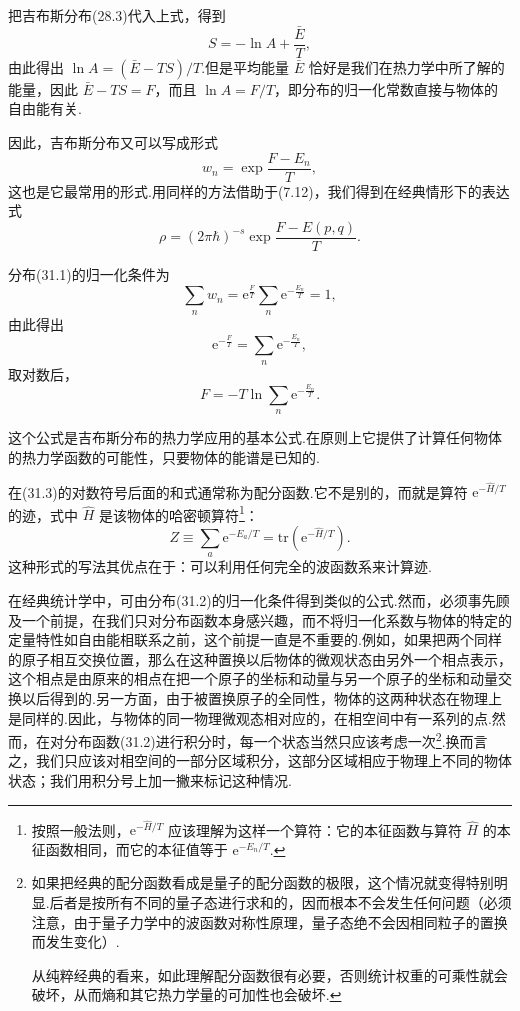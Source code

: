 把吉布斯分布(28.3)代入上式，得到
\begin{equation*}
  S=-\ln A+\frac{\bar{E}}{T},
\end{equation*}
由此得出 $\ln A=(\bar{E}-TS)/T$.但是平均能量 $\bar{E}$ 恰好是我们在热力学中所了解的能量，因此 $\bar{E}-TS=F$，而且 $\ln A=F/T$，即分布的归一化常数直接与物体的自由能有关.

因此，吉布斯分布又可以写成形式
\begin{equation}
  w_n=\exp\frac{F-E_n}{T},
\end{equation}
这也是它最常用的形式.用同样的方法借助于(7.12)，我们得到在经典情形下的表达式
\begin{equation}
  \rho=(2\pi\hbar)^{-s}\exp\frac{F-E(p,q)}{T}.
\end{equation}

分布(31.1)的归一化条件为
\begin{equation*}
  \sum_n w_n=\mathrm{e}^{\frac{F}{T}}\sum_n\mathrm{e}^{-\frac{E_n}{T}}=1,
\end{equation*}
由此得出
\begin{equation*}
  \mathrm{e}^{-\frac{F}{T}}=\sum_n\mathrm{e}^{-\frac{E_n}{T}},
\end{equation*}
取对数后，
\begin{equation}
  F=-T\ln\sum_n\mathrm{e}^{-\frac{E_n}{T}}.
\end{equation}

这个公式是吉布斯分布的热力学应用的基本公式.在原则上它提供了计算任何物体的热力学函数的可能性，只要物体的能谱是已知的.

在(31.3)的对数符号后面的和式通常称为配分函数.它不是别的，而就是算符 $\mathrm{e}^{-\hat{H}/T}$ 的迹，式中 $\hat{H}$ 是该物体的哈密顿算符\footnote{按照一般法则，$\mathrm{e}^{-\hat{H}/T}$ 应该理解为这样一个算符：它的本征函数与算符 $\hat{H}$ 的本征函数相同，而它的本征值等于 $\mathrm{e}^{-E_n/T}$.}：
\begin{equation}
  Z\equiv\sum_a\mathrm{e}^{-E_a/T}=\mathrm{tr}\left(\mathrm{e}^{-\hat{H}/T}\right).
\end{equation}
这种形式的写法其优点在于：可以利用任何完全的波函数系来计算迹.

在经典统计学中，可由分布(31.2)的归一化条件得到类似的公式.然而，必须事先顾及一个前提，在我们只对分布函数本身感兴趣，而不将归一化系数与物体的特定的定量特性如自由能相联系之前，这个前提一直是不重要的.例如，如果把两个同样的原子相互交换位置，那么在这种置换以后物体的微观状态由另外一个相点表示，这个相点是由原来的相点在把一个原子的坐标和动量与另一个原子的坐标和动量交换以后得到的.另一方面，由于被置换原子的全同性，物体的这两种状态在物理上是同样的.因此，与物体的同一物理微观态相对应的，在相空间中有一系列的点.然而，在对分布函数(31.2)进行积分时，每一个状态当然只应该考虑一次\footnote{如果把经典的配分函数看成是量子的配分函数的极限，这个情况就变得特别明显.后者是按所有不同的量子态进行求和的，因而根本不会发生任何问题（必须注意，由于量子力学中的波函数对称性原理，量子态绝不会因相同粒子的置换而发生变化）.\par
从纯粹经典的看来，如此理解配分函数很有必要，否则统计权重的可乘性就会破坏，从而熵和其它热力学量的可加性也会破坏.}.换而言之，我们只应该对相空间的一部分区域积分，这部分区域相应于物理上不同的物体状态；我们用积分号上加一撇来标记这种情况.

